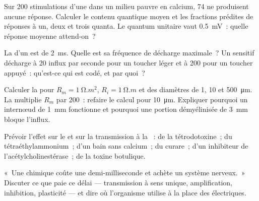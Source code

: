 \begin{exercise}[$\star\star$]\label{exo:b2:neurons-synapses:8}
Sur 200 stimulations d'une  dans un milieu pauvre en calcium, 74
ne produisent aucune réponse. Calculer le contenu quantique moyen et les
fractions prédites de réponses à un, deux et trois quanta. Le quantum
unitaire vaut \qty{0.5}{mV}~: quelle réponse moyenne attend-on~?
\end{exercise}

\begin{exercise}[$\star\star$]\label{exo:b2:neurons-synapses:9}
La  d'un  est de \qty{2}{ms}. Quelle est sa
fréquence de décharge maximale~? Un  sensitif décharge à 20
influx par seconde pour un toucher léger et à 200 pour un toucher appuyé~:
qu'est-ce qui est codé, et par quoi~?
\end{exercise}

\begin{exercise}[$\star\star\star$]\label{exo:b2:neurons-synapses:10}
Calculer la  pour $R_m = \qty{1}{\ohm.m^2}$, $R_i =
\qty{1}{\ohm.m}$ et des diamètres de 1, 10 et \qty{500}{\micro m}. La
 multiplie $R_m$ par 200~: refaire le calcul pour \qty{10}{\micro m}.
Expliquer pourquoi un internœud de \qty{1}{mm} fonctionne et pourquoi
une portion démyélinisée de \qty{3}{mm} bloque l'influx.
\end{exercise}

\begin{exercise}[$\star\star\star$]\label{exo:b2:neurons-synapses:11}
Prévoir l'effet sur le  et sur la transmission à la
~: de la tétrodotoxine~; du
tétraéthylammonium~; d'un bain sans calcium~; du curare~; d'un
inhibiteur de l'acétylcholinestérase~; de la toxine botulique.
\end{exercise}

\begin{exercise}[$\star\star\star$]\label{exo:b2:neurons-synapses:12}
«~Une  chimique coûte une demi-milliseconde et achète un système
nerveux.~» Discuter ce que paie ce délai --- transmission à sens unique,
amplification, inhibition, plasticité --- et dire où l'organisme utilise
à la place des  électriques.
\end{exercise}

